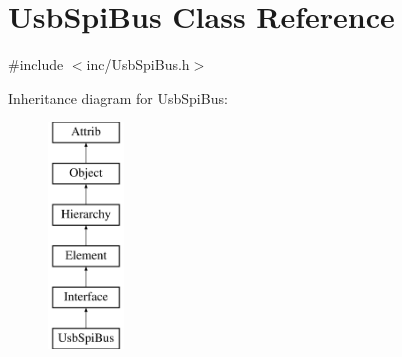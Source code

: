 \hypertarget{classUsbSpiBus}{}\section{Usb\+Spi\+Bus Class Reference}
\label{classUsbSpiBus}


{\ttfamily \#include $<$inc/\+Usb\+Spi\+Bus.\+h$>$}

Inheritance diagram for Usb\+Spi\+Bus\+:\begin{figure}[H]
\begin{center}
\leavevmode
\includegraphics[height=6.000000cm]{classUsbSpiBus}
\end{center}
\end{figure}
